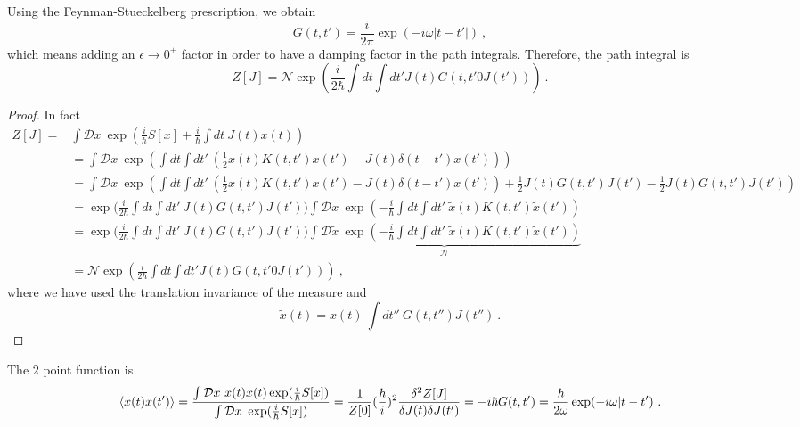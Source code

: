     Using the Feynman-Stueckelberg prescription, we obtain 
    \begin{equation*}
        G(t, t') = \frac{i}{2\pi} \exp(- i \omega |t - t'|) ~,
    \end{equation*}
    which means adding an $\epsilon \rightarrow 0^+$ factor in order to have a damping factor in the path integrals.
    Therefore, the path integral is  
    \begin{equation*}
        Z[J] = \mathcal N \exp(\frac{i}{2\hbar} \int dt \int dt' J(t) G(t, t'0 J(t'))) ~.
    \end{equation*}
    \begin{proof}
        In fact 
        \begin{equation*}
        \begin{aligned}
            Z[J] = & \int \mathcal D x ~ \exp(\frac{i}{\hbar} S[x] + \frac{i}{\hbar} \int dt ~ J(t) x(t)) \\ & = \int \mathcal D x ~ \exp(\int dt \int dt' ~ (\frac{1}{2} x(t) K(t, t') x(t') - J(t) \delta(t-t') x(t'))) \\ & = \int \mathcal D x ~ \exp(\int dt \int dt' ~ (\frac{1}{2} x(t) K(t, t') x(t') - J(t) \delta(t-t') x(t')) + \frac{1}{2} J(t) G(t,t') J(t') - \frac{1}{2} J(t) G(t,t') J(t')) \\ & = \exp \Big(\frac{i}{2\hbar} \int dt \int dt' ~ J(t) G(t, t') J(t') \Big) \int \mathcal D x ~ \exp(- \frac{i}{\hbar} \int dt \int dt' ~ \tilde x(t) K(t, t') \tilde x(t')) \\ & = \exp \Big(\frac{i}{2\hbar} \int dt \int dt' ~ J(t) G(t, t') J(t') \Big) \underbrace{\int \mathcal D \tilde x ~ \exp(- \frac{i}{\hbar} \int dt \int dt' ~ \tilde x(t) K(t, t') \tilde x(t'))}_{\mathcal N} \\ & = \mathcal N \exp(\frac{i}{2\hbar} \int dt \int dt' J(t) G(t, t'0 J(t'))) ~,
        \end{aligned}
        \end{equation*}
        where we have used the translation invariance of the measure and 
        \begin{equation*}
            \tilde x(t) = x(t) ~ \int dt'' ~ G(t, t'') J(t'') ~.
        \end{equation*}
    \end{proof}

    The $2$ point function is 
    \begin{equation*}
        \langle x(t) x(t')\rangle = \frac{\int \mathcal D x ~ x(t) x(t) \exp(\frac{i}{\hbar} S[x])}{\int \mathcal D x ~ \exp(\frac{i}{\hbar} S[x])} = \frac{1}{Z[0]} (\frac{\hbar}{i})^2 \frac{\delta^2 Z[J]}{\delta J(t) \delta J(t')} = - i \hbar G(t, t') = \frac{\hbar}{2 \omega} \exp(- i \omega |t - t') ~.
    \end{equation*}

